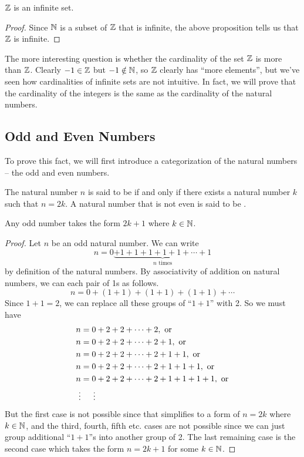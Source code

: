 \begin{corollary}[$\Z$ is Infinite]
    $\Z$ is an infinite set.
\end{corollary}
\begin{proof}
    Since $\mathbb{N}$ is a subset of $\Z$ that is infinite, the above proposition tells us that $\Z$ is infinite.
\end{proof}

The more interesting question is whether the cardinality of the set $\Z$ is more than $\Z$. Clearly $-1 \in \mathbb{Z}$ but $-1 \notin \mathbb{N}$, so $\Z$ clearly has ``more elements'', but we've seen how cardinalities of infinite sets are not intuitive. In fact, we will prove that the cardinality of the integers is the same as the cardinality of the natural numbers.

\subsection{Odd and Even Numbers}
To prove this fact, we will first introduce a categorization of the natural numbers -- the odd and even numbers.

\begin{definition}
    The natural number $n$ is said to be  if and only if there exists a natural number $k$ such that $n = 2k$. A natural number that is not even is said to be .
\end{definition}

\begin{proposition}\label{prop:odd-number-formula}
    Any odd number takes the form $2k + 1$ where $k \in \mathbb{N}$.
\end{proposition}
\begin{proof}
    Let $n$ be an odd natural number. We can write
    \[
        n = 0 \underbrace{+ 1 + 1 + 1 + 1 + 1 + \cdots + 1}_{n \text{ times}}
    \]
    by definition of the natural numbers. By associativity of addition on natural numbers, we can each pair of 1s as follows.
    \[
        n = 0 + (1 + 1) + (1 + 1) + (1 + 1) + \cdots
    \]
    Since $1 + 1 = 2$, we can replace all these groups of ``$1+1$'' with 2. So we must have
    \begin{align*}
        n &= 0 + 2 + 2 + \cdots + 2, \text{ or}\\
        n &= 0 + 2 + 2 + \cdots + 2 + 1, \text{ or}\\
        n &= 0 + 2 + 2 + \cdots + 2 + 1 + 1, \text{ or}\\
        n &= 0 + 2 + 2 + \cdots + 2 + 1 + 1 + 1, \text{ or}\\
        n &= 0 + 2 + 2 + \cdots + 2 + 1 + 1 + 1 + 1, \text{ or}\\
        \vdots &\quad\hskip0.5em\relax \vdots
    \end{align*}
    But the first case is not possible since that simplifies to a form of $n = 2k$ where $k \in \mathbb{N}$, and the third, fourth, fifth etc. cases are not possible since we can just group additional ``$1+1$''s into another group of 2. The last remaining case is the second case which takes the form $n = 2k + 1$ for some $k \in \mathbb{N}$.
\end{proof}

